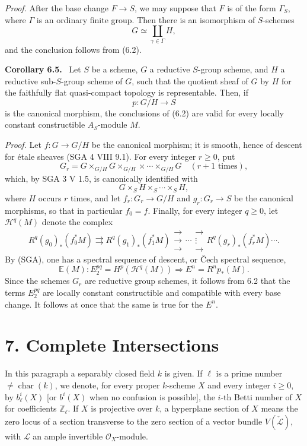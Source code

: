 \documentclass[11pt]{article}
\newenvironment{statement}[1]{\par\medskip\noindent\textbf{#1.}\ }{\par\medskip}
\begin{document}
\emph{Proof.} After the base change $F\to S$, we may suppose that $F$ is of the form $\Gamma_S$, where $\Gamma$ is an ordinary finite group. Then there is an isomorphism of $S$-schemes
\[
G\simeq\coprod_{\gamma\in\Gamma}H,
\]
and the conclusion follows from (6.2).

\begin{statement}{Corollary 6.5}
Let $S$ be a scheme, $G$ a reductive $S$-group scheme, and $H$ a reductive sub-$S$-group scheme of $G$, such that the quotient sheaf of $G$ by $H$ for the faithfully flat quasi-compact topology is representable. Then, if
\[
p:G/H\to S
\]
is the canonical morphism, the conclusions of (6.2) are valid for every locally constant constructible $A_S$-module $M$.
\end{statement}

\emph{Proof.} Let $f:G\to G/H$ be the canonical morphism; it is smooth, hence of descent for étale sheaves (SGA 4 VIII 9.1). For every integer $r\ge0$, put
\[
G_r=G\times_{G/H}G\times_{G/H}\times\cdots\times_{G/H}G
\quad(r+1\text{ times}),
\]
which, by SGA 3 V 1.5, is canonically identified with
\[
G\times_S H\times_S\cdots\times_S H,
\]
where $H$ occurs $r$ times, and let $f_r:G_r\to G/H$ and $g_r:G_r\to S$ be the canonical morphisms, so that in particular $f_0=f$. Finally, for every integer $q\ge0$, let $\mathcal H^q(M)$ denote the complex
\[
R^q(g_0)_*(f_0^*M)\rightrightarrows R^q(g_1)_*(f_1^*M)\mathrel{\substack{\to\\\to\\\to}}\cdots\mathrel{\substack{\to\\\vdots\\\to}} R^q(g_r)_*(f_r^*M)\cdots .
\]
By (SGA), one has a spectral sequence of descent, or Čech spectral sequence,
\[
\mathbb E(M):E_2^{pq}=H^p(\mathcal H^q(M))\Rightarrow E^n=R^np_*(M).
\]
Since the schemes $G_r$ are reductive group schemes, it follows from 6.2 that the terms $E_2^{pq}$ are locally constant constructible and compatible with every base change. It follows at once that the same is true for the $E^n$.

\section*{7. Complete Intersections}

In this paragraph a separably closed field $k$ is given. If $\ell$ is a prime number $\ne\operatorname{char}(k)$, we denote, for every proper $k$-scheme $X$ and every integer $i\ge0$, by
$b_\ell^i(X)$ [or $b^i(X)$ when no confusion is possible], the $i$-th Betti number of $X$ for coefficients $\mathbb Z_\ell$. If $X$ is projective over $k$, a hyperplane section of $X$ means the zero locus of a section transverse to the zero section of a vector bundle $V(\check{\mathcal L})$, with $\mathcal L$ an ample invertible $\mathcal O_X$-module.
\end{document}

